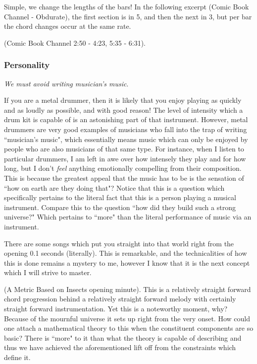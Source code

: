 \documentclass[12pt]{book}
\theoremstyle{plain}
\theoremstyle{definition}
\begin{document}
Simple, we change the lengths of the bars! In the following excerpt (Comic Book Channel - Obdurate), the first section is in 5, and then the next in 3, but per bar the chord changes occur at the same rate.

(Comic Book Channel 2:50 - 4:23, 5:35 - 6:31).

\subsubsection{Personality}
\begin{center}
	\emph{We must avoid writing musician's music}.
	\end{center}
If you are a metal drummer, then it is likely that you enjoy playing as quickly and as loudly as possible, and with good reason! The level of intensity which a drum kit is capable of is an astonishing part of that instrument. However, metal drummers are very good examples of musicians who fall into the trap of writing ``musician's music", which essentially means music which can only be enjoyed by people who are also musicians of that same type. For instance, when I listen to particular drummers, I am left in awe over how intensely they play and for how long, but I don't \emph{feel} anything emotionally compelling from their composition. This is because the greatest appeal that the music has to be is the sensation of ``how on earth are they doing that"? Notice that this is a question which specifically pertains to the literal fact that this is a person playing a musical instrument. Compare this to the question ``how did they build such a strong universe?" Which pertains to ``more" than the literal performance of music via an instrument.

There are some songs which put you straight into that world right from the opening 0.1 seconds (literally). This is remarkable, and the technicalities of how this is done remains a mystery to me, however I know that it is the next concept which I will strive to master.

(A Metric Based on Insects opening minute). This is a relatively straight forward chord progression behind a relatively straight forward melody with certainly straight forward instrumentation. Yet this is a noteworthy moment, why? Because of the mournful universe it sets up right from the very onset. How could one attach a mathematical theory to this when the constituent components are so basic? There is ``more" to it than what the theory is capable of describing and thus we have achieved the aforementioned lift off from the constraints which define it.
\end{document}
